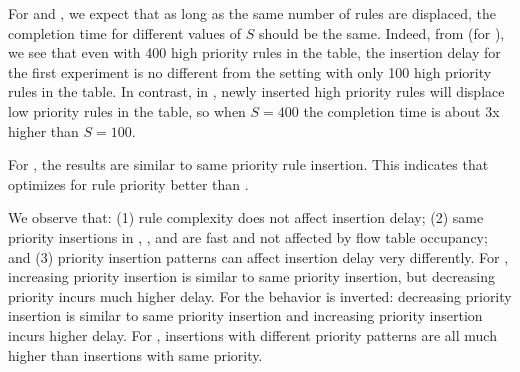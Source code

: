 For \BroadcomOne and \BroadcomThree, we expect that as long as the same
number of rules are displaced, the completion time for different values of
$S$ should be the same.
Indeed, from  (for
\BroadcomOne), we see that even with 400 high priority rules in the
table, the insertion delay for the first experiment is no different from the
setting with only 100 high priority rules in the table. In contrast, in
, newly inserted high
priority rules will displace low priority rules in the table, so when
$S=400$ the completion time is about 3x higher than $S=100$. 

For \Intel, the results are similar to same priority rule insertion.  This
indicates that \Intel optimizes for rule priority better than \BroadcomOne. 

 
We observe that: (1) rule complexity does not affect insertion delay; (2)
same priority insertions in \BroadcomOne, \BroadcomThree, and \Intel are fast
and not affected by flow table occupancy; and (3) priority insertion patterns
can affect insertion delay very differently. For \Intel, increasing priority
insertion is similar to same priority insertion, but decreasing priority 
incurs much higher delay. For \BroadcomThree the behavior is inverted:  
decreasing priority insertion is similar to same priority insertion and increasing priority insertion incurs higher delay. For \BroadcomOne, 
insertions with different priority patterns are all much higher than
insertions with same priority. 

